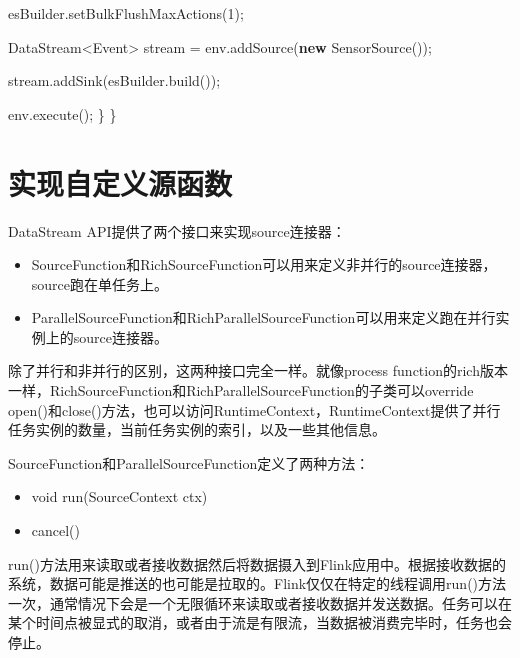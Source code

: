 \documentclass[cn,11pt,chinese]{elegantbook}
\newenvironment{Shaded}{}{}
\newcommand{\BuiltInTok}[1]{#1}
\newcommand{\DecValTok}[1]{\textcolor[rgb]{0.25,0.63,0.44}{#1}}
\newcommand{\FunctionTok}[1]{\textcolor[rgb]{0.02,0.16,0.49}{#1}}
\newcommand{\KeywordTok}[1]{\textcolor[rgb]{0.00,0.44,0.13}{\textbf{#1}}}
\newcommand{\NormalTok}[1]{#1}
\providecommand{\tightlist}{%
  \setlength{\itemsep}{0pt}\setlength{\parskip}{0pt}}
\begin{document}
\begin{Shaded}
\begin{Highlighting}[]
\NormalTok{        esBuilder.}\FunctionTok{setBulkFlushMaxActions}\NormalTok{(}\DecValTok{1}\NormalTok{);}

\NormalTok{        DataStream\textless{}}\BuiltInTok{Event}\NormalTok{\textgreater{} stream = env.}\FunctionTok{addSource}\NormalTok{(}\KeywordTok{new} \FunctionTok{SensorSource}\NormalTok{());}

\NormalTok{        stream.}\FunctionTok{addSink}\NormalTok{(esBuilder.}\FunctionTok{build}\NormalTok{());}

\NormalTok{        env.}\FunctionTok{execute}\NormalTok{();}
\NormalTok{    \}}
\NormalTok{\}}
\end{Highlighting}
\end{Shaded}

\hypertarget{ux5b9eux73b0ux81eaux5b9aux4e49ux6e90ux51fdux6570}{%
\section{实现自定义源函数}\label{ux5b9eux73b0ux81eaux5b9aux4e49ux6e90ux51fdux6570}}

DataStream API提供了两个接口来实现source连接器：

\begin{itemize}
\tightlist
\item
  SourceFunction和RichSourceFunction可以用来定义非并行的source连接器，source跑在单任务上。
\item
  ParallelSourceFunction和RichParallelSourceFunction可以用来定义跑在并行实例上的source连接器。
\end{itemize}

除了并行和非并行的区别，这两种接口完全一样。就像process
function的rich版本一样，RichSourceFunction和RichParallelSourceFunction的子类可以override
open()和close()方法，也可以访问RuntimeContext，RuntimeContext提供了并行任务实例的数量，当前任务实例的索引，以及一些其他信息。

SourceFunction和ParallelSourceFunction定义了两种方法：

\begin{itemize}
\tightlist
\item
  void run(SourceContext ctx)
\item
  cancel()
\end{itemize}

run()方法用来读取或者接收数据然后将数据摄入到Flink应用中。根据接收数据的系统，数据可能是推送的也可能是拉取的。Flink仅仅在特定的线程调用run()方法一次，通常情况下会是一个无限循环来读取或者接收数据并发送数据。任务可以在某个时间点被显式的取消，或者由于流是有限流，当数据被消费完毕时，任务也会停止。
\end{document}
